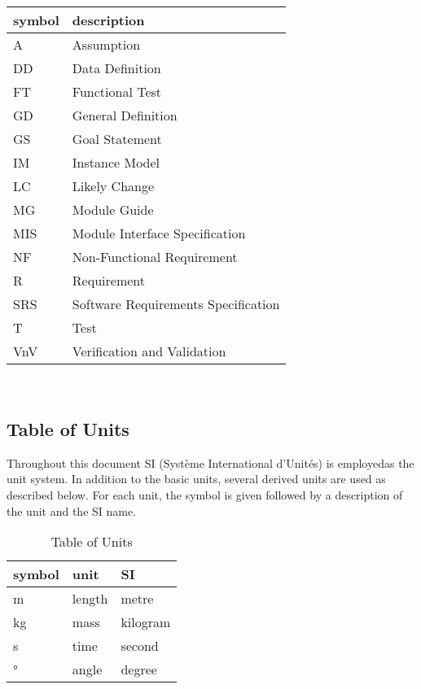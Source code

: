 \documentclass[12pt, titlepage]{article}
\begin{document}
\renewcommand{\arraystretch}{1.2}
\begin{tabular}{l l} 
  \toprule		
  \textbf{symbol} & \textbf{description}\\
  \midrule 
  A & Assumption\\
  DD & Data Definition\\
  FT & Functional Test \\
  GD & General Definition\\
  GS & Goal Statement\\
  IM & Instance Model\\
  LC & Likely Change\\
  MG & Module Guide\\ 
  MIS & Module Interface Specification\\ 
  NF & Non-Functional Requirement\\
  R & Requirement\\
  SRS & Software Requirements Specification\\
  T & Test\\
  VnV & Verification and Validation\\ 
  \bottomrule
\end{tabular}\\

\subsection{Table of Units}

Throughout this document SI (Syst\`{e}me International d'Unit\'{e}s) is
employedas  the unit system. In addition to the basic units, several derived
units are
used as described below.  For each unit, the symbol is given followed by a
description of the unit and the SI name.\\

\renewcommand{\arraystretch}{1.2}
\begin{table}[h!]
	\centering
\begin{center}
  \noindent \begin{tabular}{l l l} 
    \toprule		
    \textbf{symbol} & \textbf{unit} & \textbf{SI}\\
    \midrule 
    \si{\metre} & length & metre\\
    \si{\kilogram} & mass & kilogram\\
    \si{\second} & time & second\\
    \si{\degree} & angle & degree\\
    \bottomrule
  \end{tabular}
\end{center}
	\caption{Table of Units}
	\label{Table:R_trace}
\end{table}
\end{document}
